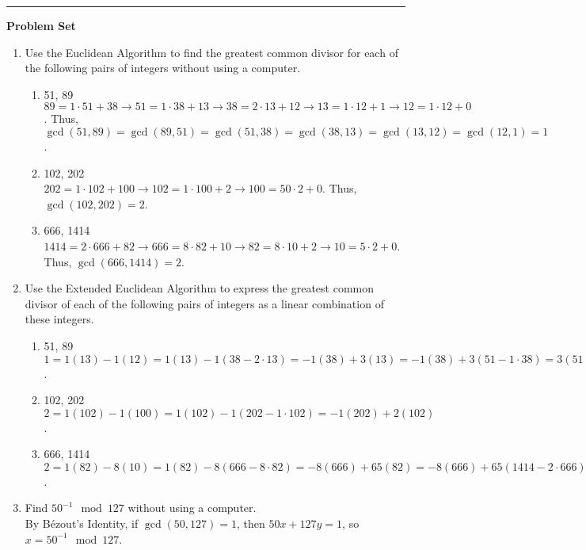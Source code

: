 \documentclass{article}
\begin{document}
\hrule \vspace{8pt}   
\textbf{Problem Set}
    \begin{enumerate}
        \item Use the Euclidean Algorithm to find the greatest common divisor for each of the following pairs of integers without using a computer.
        \begin{enumerate}
            \item 51, 89\\
            $89 = 1\cdot51 + 38 \to 51 = 1\cdot38 + 13 \to 38 = 2\cdot13 + 12 \to 13 = 1\cdot12 + 1 \to 12 = 1\cdot12 + 0$. Thus, $\gcd(51, 89) = \gcd(89, 51) = \gcd(51, 38) = \gcd(38, 13) = \gcd(13, 12) = \gcd(12, 1) = 1$.
            \item 102, 202\\
            $202 = 1\cdot102 + 100 \to 102 = 1\cdot100 + 2 \to 100 = 50\cdot2 + 0$. Thus, $\gcd(102, 202) = 2$.
            \item 666, 1414\\
            $1414 = 2\cdot666 + 82 \to 666 = 8\cdot82 + 10 \to 82 = 8\cdot10 + 2 \to 10 = 5\cdot2 + 0$. Thus, $\gcd(666, 1414) = 2$.
        \end{enumerate}
        \item Use the Extended Euclidean Algorithm to express the greatest common divisor of each of the following pairs of integers as a linear combination of these integers.
        \begin{enumerate}
            \item 51, 89\\
            $1 = 1(13) - 1(12) = 1(13) - 1(38 - 2\cdot13) = -1(38) + 3(13) = -1(38) + 3(51-1\cdot38) = 3(51) - 4(38) = 3(51) - 4(89-1\cdot51) = -4(89) + 7(51)$.
            \item 102, 202\\
            $2 = 1(102) - 1(100) = 1(102) - 1(202 - 1\cdot102) = -1(202) + 2(102)$.
            \item 666, 1414\\
            $2 = 1(82) - 8(10) = 1(82) - 8(666 - 8\cdot82) = -8(666) + 65(82) = -8(666) + 65(1414-2\cdot666) = 65(1414) - 138(666)$.
        \end{enumerate}
        \item Find $50^{-1} \mod{127}$ without using a computer.\\
        By Bézout’s Identity, if $\gcd(50, 127) = 1$, then $50x + 127y = 1$, so $x = 50^{-1} \mod{127}$. \\

\end{enumerate}
\end{document}
